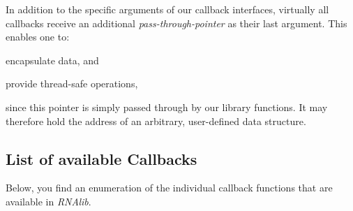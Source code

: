 In addition to the specific arguments of our callback interfaces, virtually all callbacks receive an additional {\itshape pass-\/through-\/pointer} as their last argument. This enables one to\+:
\begin{DoxyItemize}
\item encapsulate data, and
\item provide thread-\/safe operations,
\end{DoxyItemize}

since this pointer is simply passed through by our library functions. It may therefore hold the address of an arbitrary, user-\/defined data structure.\hypertarget{callbacks_callback_descriptions}{}\subsection{List of available Callbacks}\label{callbacks_callback_descriptions}
Below, you find an enumeration of the individual callback functions that are available in {\itshape R\+N\+Alib}.


